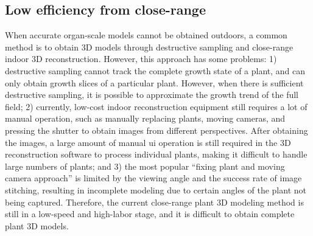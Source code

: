 
\subsection{Low efficiency from close-range}
When accurate organ-scale models cannot be obtained outdoors, a common method is to obtain 3D models through destructive sampling and close-range indoor 3D reconstruction. However, this approach has some problems: 1) destructive sampling cannot track the complete growth state of a plant, and can only obtain growth slices of a particular plant. However, when there is sufficient destructive sampling, it is possible to approximate the growth trend of the full field; 2) currently, low-cost indoor reconstruction equipment still requires a lot of manual operation, such as manually replacing plants, moving cameras, and pressing the shutter to obtain images from different perspectives. After obtaining the images, a large amount of manual \gls{ui} operation is still required in the 3D reconstruction software to process individual plants, making it difficult to handle large numbers of plants; and 3) the most popular ``fixing plant and moving camera approach'' is limited by the viewing angle and the success rate of image stitching, resulting in incomplete modeling due to certain angles of the plant not being captured. Therefore, the current close-range plant 3D modeling method is still in a low-speed and high-labor stage, and it is difficult to obtain complete plant 3D models.

